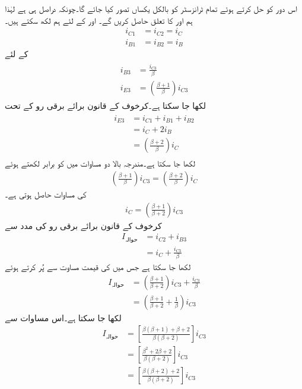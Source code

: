 اس دور کو حل کرتے ہوئے تمام ٹرانزسٹر کو بالکل یکساں تصور کیا جائے گا۔چونکہ  دراصل  ہی ہے لہٰذا ہم  اور  کا تعلق حاصل کریں گے۔ اور  کے لئے ہم لکھ سکتے ہیں۔
\begin{align*}
i_{C1}&=i_{C2}=i_C\\
i_{B1}&=i_{B2}=i_B
\end{align*}
 کے لئے
\begin{gather}\label{مساوات_تفرقی_ولسن_تیسرے_ٹرانزسٹر_رو}
\begin{aligned}
i_{B3}&=\frac{i_{C3}}{\beta}\\
i_{E3}&=\left(\frac{\beta+1}{\beta}\right) i_{C3}
\end{aligned}
\end{gather}
لکھا جا سکتا ہے۔کرخوف کے قانون برائے برقی رو کے تحت
\begin{gather}
\begin{aligned}\label{مساوات_تفرقی_ولسن_کرخوف_کا_قانون}
i_{E3}&=i_{C1}+i_{B1}+i_{B2}\\
&=i_C+2 i_B\\
&=\left(\frac{\beta+2}{\beta} \right) i_C
\end{aligned}
\end{gather}
لکھا جا سکتا ہے۔مندرجہ بالا دو مساوات میں  کو برابر لکھتے ہوئے
\begin{align*}
\left(\frac{\beta+1}{\beta}\right) i_{C3}=\left(\frac{\beta+2}{\beta} \right) i_C
\end{align*}
 کی مساوات حاصل ہوتی ہے۔
\begin{align}\label{مساوات_تفرقی_محاصل_رو_کی_مساوات}
i_C=\left(\frac{\beta+1}{\beta+2}\right) i_{C3}
\end{align}
کرخوف کے قانون برائے برقی رو کی مدد سے 
\begin{align*}
I_{\textrm{حوالہ}}&=i_{C2}+i_{B3}\\
&=i_{C}+\frac{i_{C3}}{\beta}
\end{align*}
لکھا جا سکتا ہے جس میں  کی قیمت مساوت  سے پُر کرتے ہوئے
\begin{align*}
I_{\textrm{حوالہ}}&=\left(\frac{\beta+1}{\beta+2}\right) i_{C3}+\frac{i_{C3}}{\beta}\\
&=\left(\frac{\beta+1}{\beta+2}+\frac{1}{\beta} \right) i_{C3}
\end{align*}
لکھا جا سکتا ہے۔اس مساوات سے
\begin{align*}
I_{\textrm{حوالہ}}&=\left[\frac{\beta \left(\beta+1 \right)+\beta+2}{\beta \left(\beta+2 \right)}\right]i_{C3}\\
&=\left[\frac{\beta^2+2 \beta+2}{\beta \left(\beta+2 \right)}\right]i_{C3}\\
&=\left[\frac{\beta \left(\beta+2 \right)+2}{\beta \left(\beta+2 \right)}\right]i_{C3}
\end{align*}
